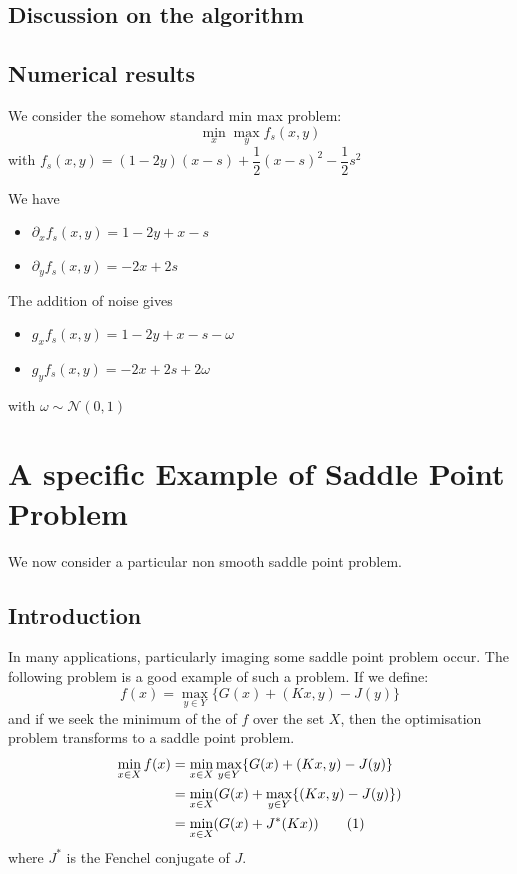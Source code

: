 \documentclass[12pt,reqno]{amsart}
\numberwithin{equation}{section}
\newcommand\numberthis{\addtocounter{equation}{1}\tag{\theequation}}
\begin{document}
\subsection{Discussion on the algorithm}

\subsection{Numerical results}

We consider the somehow standard min max problem:
$$
\min_{x}\max_{y} f_{s}(x,y)
$$
with $f_{s}(x,y) = (1 - 2y)(x - s) + \dfrac{1}{2}(x - s)^{2} - \dfrac{1}{2}s^{2} $

We have 

\begin{itemize}
\item $\partial_{x} f_{s}(x,y) = 1 - 2y + x - s$
\item $\partial_{y} f_{s}(x,y) = -2x + 2s$
\end{itemize}

The addition of noise gives

\begin{itemize}
\item $g_{x} f_{s}(x,y) = 1 - 2y + x - s - \omega$
\item $g_{y} f_{s}(x,y) = -2x + 2s + 2\omega$
\end{itemize}

with $\omega \sim \mathcal{N}(0,1)$

\section{ A specific Example of Saddle Point Problem}

We now consider a particular  non smooth saddle point problem.

\subsection{Introduction}

In many applications, particularly imaging some saddle point problem occur. The following problem is a good example of such a problem.
If we define:
$$
f(x) = \max_{y \in Y} \{ G(x) + (Kx,y) - J(y) \} 
$$
and if we seek the minimum of the of $f$ over the set $X$, then the optimisation problem transforms to a saddle point problem.
\begin{align*}
\min_{x \in X} f(x) &= \min_{x \in X}\max_{y \in Y} \{ G(x) + (Kx,y) - J(y)\} \\
&= \min_{x \in X} (G(x) + \max_{y \in Y} \{  (Kx,y) - J(y)\})\\
&= \min_{x \in X} (G(x) + J^{*}(Kx)) \numberthis \label{SPPpart}
\end{align*}
where $J^{*}$ is the Fenchel conjugate of $J$.
\end{document}
